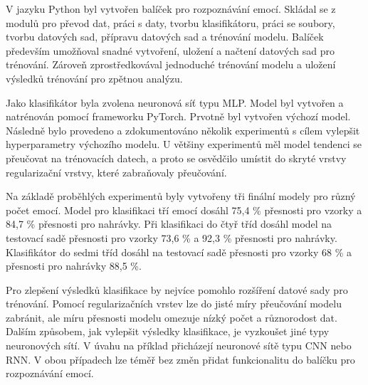 \documentclass[FM,BP]{tulthesis}
\begin{document}
V jazyku Python byl vytvořen balíček pro rozpoznávání emocí. Skládal se z modulů pro převod dat, práci s daty, tvorbu klasifikátoru, práci se soubory, tvorbu datových sad, přípravu datových sad a trénování modelu. Balíček především umožňoval snadné vytvoření, uložení a načtení datových sad pro trénování. Zároveň zprostředkovával jednoduché trénování modelu a uložení výsledků trénování pro zpětnou analýzu.

Jako klasifikátor byla zvolena neuronová síť typu MLP. Model byl vytvořen a natrénován pomocí frameworku PyTorch. Prvotně byl vytvořen výchozí model. Následně bylo provedeno a zdokumentováno několik experimentů s cílem vylepšit hyperparametry výchozího modelu. U většiny experimentů měl model tendenci se přeučovat na trénovacích datech, a proto se osvědčilo umístit do skryté vrstvy regularizační vrstvy, které zabraňovaly přeučování.

Na základě proběhlých experimentů byly vytvořeny tři finální modely pro různý počet emocí. Model pro klasifikaci tří emocí dosáhl 75,4 \% přesnosti pro vzorky a 84,7 \% přesnosti pro nahrávky. Při klasifikaci do čtyř tříd dosáhl model na testovací sadě přesnosti pro vzorky 73,6 \% a 92,3 \% přesnosti pro nahrávky. Klasifikátor do sedmi tříd dosáhl na testovací sadě přesnosti pro vzorky 68 \% a přesnosti pro nahrávky 88,5 \%.

Pro zlepšení výsledků klasifikace by nejvíce pomohlo rozšíření datové sady pro trénování. Pomocí regularizačních vrstev lze do jisté míry přeučování modelu zabránit, ale míru přesnosti modelu omezuje nízký počet a různorodost dat. Dalším způsobem, jak vylepšit výsledky klasifikace, je vyzkoušet jiné typy neuronových sítí. V úvahu na příklad přicházejí neuronové sítě typu CNN nebo RNN. V obou případech lze téměř bez změn přidat funkcionalitu do balíčku pro rozpoznávání emocí.

\nocite{*}
\printbibliography[title={Použitá literatura}] %
\end{document}
